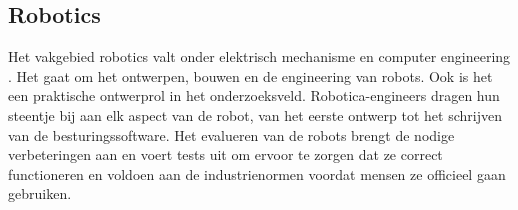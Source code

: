 \subsection{Robotics}
Het vakgebied robotics valt onder elektrisch mechanisme en computer engineering \autocite{Coursera2023}. Het gaat om het ontwerpen, bouwen en de engineering van robots. Ook is het een praktische ontwerprol in het onderzoeksveld. Robotica-engineers dragen hun steentje bij aan elk aspect van de robot, van het eerste ontwerp tot het schrijven van de besturingssoftware. Het evalueren van de robots brengt de nodige verbeteringen aan en voert tests uit om ervoor te zorgen dat ze correct functioneren en voldoen aan de industrienormen voordat mensen ze officieel gaan gebruiken. 

